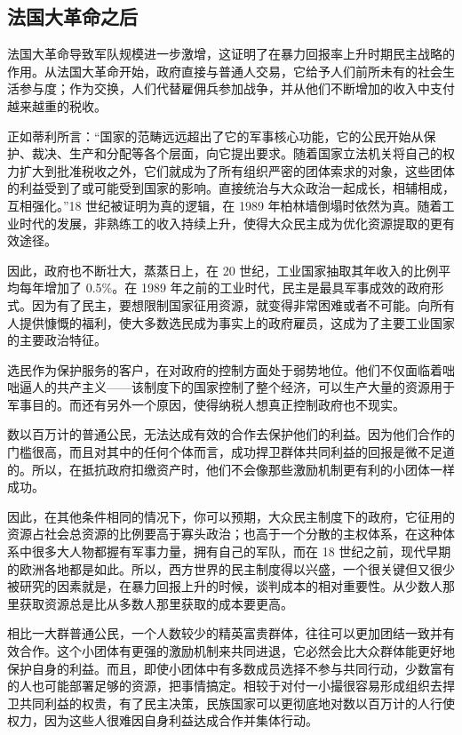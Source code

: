\subsection{法国大革命之后}
法国大革命导致军队规模进一步激增，这证明了在暴力回报率上升时期民主战略的作用。从法国大革命开始，政府直接与普通人交易，它给予人们前所未有的社会生活参与度；作为交换，人们代替雇佣兵参加战争，并从他们不断增加的收入中支付越来越重的税收。

正如蒂利所言：“国家的范畴远远超出了它的军事核心功能，它的公民开始从保护、裁决、生产和分配等各个层面，向它提出要求。随着国家立法机关将自己的权力扩大到批准税收之外，它们就成为了所有组织严密的团体索求的对象，这些团体的利益受到了或可能受到国家的影响。直接统治与大众政治一起成长，相辅相成，互相强化。”18 世纪被证明为真的逻辑，在 1989 年柏林墙倒塌时依然为真。随着工业时代的发展，非熟练工的收入持续上升，使得大众民主成为优化资源提取的更有效途径。

因此，政府也不断壮大，蒸蒸日上，在 20 世纪，工业国家抽取其年收入的比例平均每年增加了 0.5\%。在 1989 年之前的工业时代，民主是最具军事成效的政府形式。因为有了民主，要想限制国家征用资源，就变得非常困难或者不可能。向所有人提供慷慨的福利，使大多数选民成为事实上的政府雇员，这成为了主要工业国家的主要政治特征。

选民作为保护服务的客户，在对政府的控制方面处于弱势地位。他们不仅面临着咄咄逼人的共产主义——该制度下的国家控制了整个经济，可以生产大量的资源用于军事目的。而还有另外一个原因，使得纳税人想真正控制政府也不现实。

数以百万计的普通公民，无法达成有效的合作去保护他们的利益。因为他们合作的门槛很高，而且对其中的任何个体而言，成功捍卫群体共同利益的回报是微不足道的。所以，在抵抗政府扣缴资产时，他们不会像那些激励机制更有利的小团体一样成功。

因此，在其他条件相同的情况下，你可以预期，大众民主制度下的政府，它征用的资源占社会总资源的比例要高于寡头政治；也高于一个分散的主权体系，在这种体系中很多大人物都握有军事力量，拥有自己的军队，而在 18 世纪之前，现代早期的欧洲各地都是如此。所以，西方世界的民主制度得以兴盛，一个很关键但又很少被研究的因素就是，在暴力回报上升的时候，谈判成本的相对重要性。从少数人那里获取资源总是比从多数人那里获取的成本要更高。

相比一大群普通公民，一个人数较少的精英富贵群体，往往可以更加团结一致并有效合作。这个小团体有更强的激励机制来共同进退，它必然会比大众群体能更好地保护自身的利益。而且，即使小团体中有多数成员选择不参与共同行动，少数富有的人也可能部署足够的资源，把事情搞定。相较于对付一小撮很容易形成组织去捍卫共同利益的权贵，有了民主决策，民族国家可以更彻底地对数以百万计的人行使权力，因为这些人很难因自身利益达成合作并集体行动。

